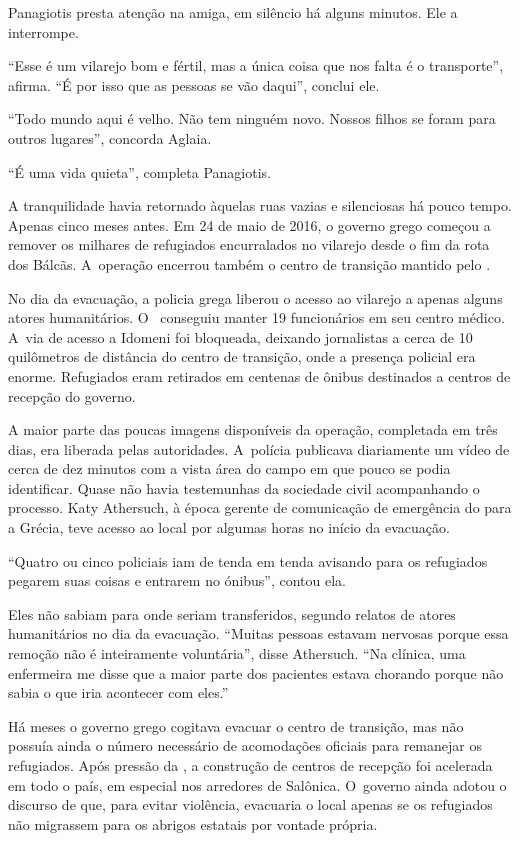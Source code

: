 Panagiotis presta atenção na amiga, em silêncio há alguns minutos. Ele a
interrompe.

``Esse é um vilarejo bom e fértil, mas a única coisa que nos falta é o
transporte'', afirma. ``É por isso que as pessoas se vão daqui'',
conclui ele.

``Todo mundo aqui é velho. Não tem ninguém novo. Nossos filhos se foram
para outros lugares'', concorda Aglaia.

``É uma vida quieta'', completa Panagiotis.

A tranquilidade havia retornado àquelas ruas vazias e silenciosas há
pouco tempo. Apenas cinco meses antes. Em 24 de maio de 2016, o governo
grego começou a remover os milhares de refugiados encurralados no
vilarejo desde o fim da rota dos Bálcãs. A~operação encerrou também o
centro de transição mantido pelo .

No dia da evacuação, a policia grega liberou o acesso ao vilarejo a
apenas alguns atores humanitários. O~ conseguiu manter 19
funcionários em seu centro médico. A~via de acesso a Idomeni foi
bloqueada, deixando jornalistas a cerca de 10 quilômetros de distância
do centro de transição, onde a presença policial era enorme. Refugiados
eram retirados em centenas de ônibus destinados a centros de recepção do
governo.

A maior parte das poucas imagens disponíveis da operação, completada em
três dias, era liberada pelas autoridades. A~polícia publicava
diariamente um vídeo de cerca de dez minutos com a vista área do campo
em que pouco se podia identificar. Quase não havia testemunhas da
sociedade civil acompanhando o processo. Katy Athersuch, à época gerente
de comunicação de emergência do  para a Grécia, teve acesso ao local
por algumas horas no início da evacuação.

``Quatro ou cinco policiais iam de tenda em tenda avisando para os
refugiados pegarem suas coisas e entrarem no ónibus'', contou ela.

Eles não sabiam para onde seriam transferidos, segundo relatos de atores
humanitários no dia da evacuação. ``Muitas pessoas estavam nervosas
porque essa remoção não é inteiramente voluntária'', disse Athersuch.
``Na clínica, uma enfermeira me disse que a maior parte dos pacientes
estava chorando porque não sabia o que iria acontecer com eles.''

Há meses o governo grego cogitava evacuar o centro de transição, mas não
possuía ainda o número necessário de acomodações oficiais para remanejar
os refugiados. Após pressão da , a construção de centros de recepção
foi acelerada em todo o país, em especial nos arredores de Salônica. O~governo ainda adotou o discurso de que, para evitar violência, evacuaria
o local apenas se os refugiados não migrassem para os abrigos estatais
por vontade própria.

